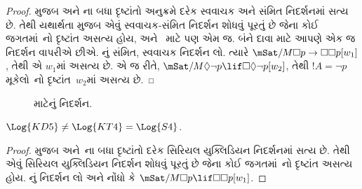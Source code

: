 \begin{proof}
   મુજબ  અને ના બધા
  દૃષ્ટાંતો અનુક્રમે દરેક સ્વવાચક અને સંમિત નિદર્શનમાં સત્ય છે. તેથી
  યથાર્થતા મુજબ એવું સ્વવાચક-સંમિત નિદર્શન શોધવું પૂરતું છે જેના કોઈ
  જગતમાં~નો દૃષ્ટાંત અસત્ય હોય, અને~ માટે પણ એમ જ. બંને
  દાવા માટે આપણે એક જ નિદર્શન વાપરીએ છીએ.
  નું સંમિત, સ્વવાચક નિદર્શન લો. ત્યારે
  $\mSat/{M}{\Box p \to \Box \Box
    p}[w_1]$, તેથી  એ $w_1$માં અસત્ય છે. એ જ રીતે,
  $\mSat/{M}{\Diamond
    \lnot p \lif \Box \Diamond \lnot p}[w_2]$, તેથી $!A = \lnot p$
  મૂકેલો~નો દૃષ્ટાંત~$w_2$માં અસત્ય છે.
\end{proof}

\begin{figure}[htpb]
  \centering
  \caption{ માટેનું નિદર્શન.}
\end{figure}

\begin{thm}
  $\Log{KD5} \neq \Log{KT4} = \Log{S4}$.
\end{thm}

\begin{proof}
   મુજબ  અને~ના બધા
  દૃષ્ટાંતો દરેક સિરિયલ યુક્લિડિયન નિદર્શનમાં સત્ય છે. તેથી એવું
  સિરિયલ યુક્લિડિયન નિદર્શન શોધવું પૂરતું છે જેના કોઈ જગતમાં~નો
  દૃષ્ટાંત અસત્ય હોય. નું નિદર્શન લો અને નોંધો કે
  $\mSat/{M}{\Box p
  \lif \Box\Box p}[w_1]$.
\end{proof}

